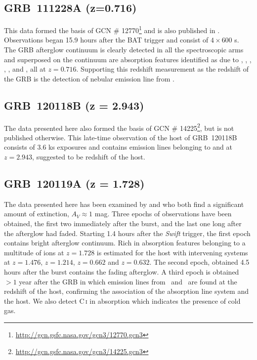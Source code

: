 \documentclass{aa}    %
\begin{document}
\subsection{GRB~111228A (z=0.716)}

This data formed the basis of GCN \#
12770\footnote{\url{http://gcn.gsfc.nasa.gov/gcn3/12770.gcn3}} and is also published in \cite{Kruhler2015}. Observations began 15.9 hours after the BAT trigger and consist of $4 \times 600$ s. The GRB afterglow continuum is clearly detected in all the spectroscopic arms and superposed on the continuum are absorption features identified as due to \feii, \mnii, \mgii, \mgi, \cah, and \cak, all at $z = 0.716$. Supporting this redshift measurement as the redshift of the GRB is the detection of nebular emission line from \oiii.

\subsection{GRB~120118B (z = 2.943)}
The data presented here also formed the basis of GCN \#
14225\footnote{\url{http://gcn.gsfc.nasa.gov/gcn3/14225.gcn3}}, but is not
published otherwise. This late-time observation of the host of GRB~120118B
consists of 3.6 ks exposures and contains emission lines belonging to \oii and
\oiii at $z = 2.943$, suggested to be redshift of the host.

\subsection{GRB~120119A (z = 1.728)} 

The data presented here has been examined by \citet{Japelj2015} and
\citet{Zafar2017} who both find a significant amount of extinction, $A_V\approx
1$ mag. Three epochs of observations have been obtained, the first two
immediately after the burst, and the last one long after the afterglow had
faded. Starting 1.4 hours after the \textit{Swift} trigger, the first epoch
contains bright afterglow continuum. Rich in absorption features belonging to a
multitude of ions at $z =    1.728$ is estimated for the host with intervening
systems at $z = 1.476$, $z = 1.214$, $z = 0.662$ and $z = 0.632$. The second
epoch, obtained 4.5 hours after the burst contains the fading afterglow. A third
epoch is obtained $>1$ year after the GRB in which emission lines from \hb~and
\ha~are found at the redshift of the host, confirming the association of the
absorption line system and the host. We also detect C\,\textsc{i} in absorption
which indicates the presence of cold gas.
\end{document}
